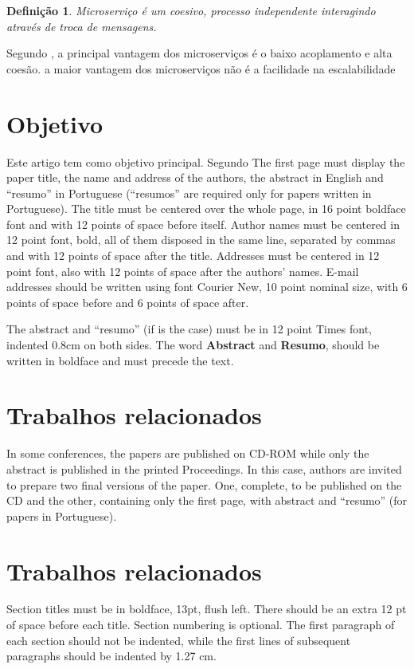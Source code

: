 \documentclass[12pt]{article}
\theoremstyle{plain}
\newtheorem*{theorem*}{Definição}
\begin{document}
\begin{theorem*}
Microserviço é um coesivo, processo independente interagindo através de troca de mensagens.
\end{theorem*}
Segundo \cite{wolf:2018}, a principal vantagem dos microserviços é o baixo acoplamento e alta coesão. a maior vantagem dos microserviços não é a facilidade na escalabilidade

\section{Objetivo} \label{sec:firstpage}

Este artigo tem como objetivo principal. Segundo \cite{Zimmermann2005}
The first page must display the paper title, the name and address of the
authors, the abstract in English and ``resumo'' in Portuguese (``resumos'' are
required only for papers written in Portuguese). The title must be centered
over the whole page, in 16 point boldface font and with 12 points of space
before itself. Author names must be centered in 12 point font, bold, all of
them disposed in the same line, separated by commas and with 12 points of
space after the title. Addresses must be centered in 12 point font, also with
12 points of space after the authors' names. E-mail addresses should be
written using font Courier New, 10 point nominal size, with 6 points of space
before and 6 points of space after.

The abstract and ``resumo'' (if is the case) must be in 12 point Times font,
indented 0.8cm on both sides. The word \textbf{Abstract} and \textbf{Resumo},
should be written in boldface and must precede the text.

\section{Trabalhos relacionados}

In some conferences, the papers are published on CD-ROM while only the
abstract is published in the printed Proceedings. In this case, authors are
invited to prepare two final versions of the paper. One, complete, to be
published on the CD and the other, containing only the first page, with
abstract and ``resumo'' (for papers in Portuguese).

\section{Trabalhos relacionados}

Section titles must be in boldface, 13pt, flush left. There should be an extra
12 pt of space before each title. Section numbering is optional. The first
paragraph of each section should not be indented, while the first lines of
subsequent paragraphs should be indented by 1.27 cm.
\end{document}
